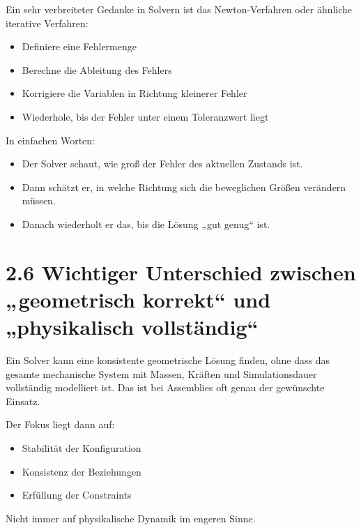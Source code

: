 \documentclass[
  12pt
]{book}
\providecommand{\tightlist}{%
  \setlength{\itemsep}{0pt}\setlength{\parskip}{0pt}}
\begin{document}
Ein sehr verbreiteter Gedanke in Solvern ist das Newton-Verfahren oder
ähnliche iterative Verfahren:

\begin{itemize}
\tightlist
\item
  Definiere eine Fehlermenge
\item
  Berechne die Ableitung des Fehlers
\item
  Korrigiere die Variablen in Richtung kleinerer Fehler
\item
  Wiederhole, bis der Fehler unter einem Toleranzwert liegt
\end{itemize}

In einfachen Worten:

\begin{itemize}
\tightlist
\item
  Der Solver schaut, wie groß der Fehler des aktuellen Zustands ist.
\item
  Dann schätzt er, in welche Richtung sich die beweglichen Größen
  verändern müssen.
\item
  Danach wiederholt er das, bis die Lösung „gut genug`` ist.
\end{itemize}

\hypertarget{wichtiger-unterschied-zwischen-geometrisch-korrekt-und-physikalisch-vollstuxe4ndig}{%
\section{\texorpdfstring{{2.6} Wichtiger Unterschied zwischen
„geometrisch korrekt`` und „physikalisch
vollständig``}{2.6 Wichtiger Unterschied zwischen „geometrisch korrekt`` und „physikalisch vollständig``}}\label{wichtiger-unterschied-zwischen-geometrisch-korrekt-und-physikalisch-vollstuxe4ndig}}

Ein Solver kann eine konsistente geometrische Lösung finden, ohne dass
das gesamte mechanische System mit Massen, Kräften und Simulationsdauer
vollständig modelliert ist. Das ist bei Assemblies oft genau der
gewünschte Einsatz.

Der Fokus liegt dann auf:

\begin{itemize}
\tightlist
\item
  Stabilität der Konfiguration
\item
  Konsistenz der Beziehungen
\item
  Erfüllung der Constraints
\end{itemize}

Nicht immer auf physikalische Dynamik im engeren Sinne.
\end{document}
